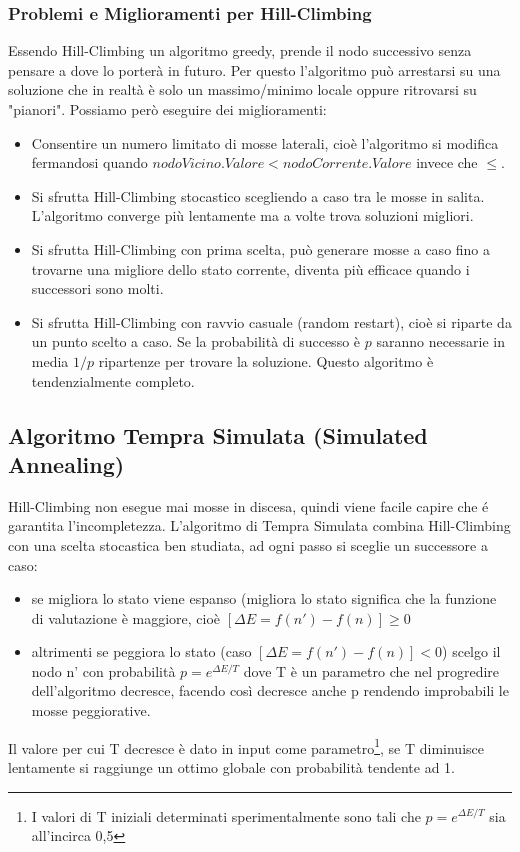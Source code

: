 \documentclass{article}
\begin{document}
\subsubsection{Problemi e Miglioramenti per Hill-Climbing}
Essendo Hill-Climbing un algoritmo greedy, prende il nodo successivo senza pensare a dove lo porterà in futuro. Per questo l'algoritmo può arrestarsi su una soluzione che in realtà è solo un massimo/minimo locale oppure ritrovarsi su "pianori". Possiamo però eseguire dei miglioramenti:
\begin{itemize}
    \item Consentire un numero limitato di mosse laterali, cioè l'algoritmo si modifica fermandosi quando $nodoVicino.Valore < nodoCorrente.Valore$ invece che $\leq$.
    \item Si sfrutta Hill-Climbing stocastico scegliendo a caso tra le mosse in salita. L'algoritmo converge più lentamente ma a volte trova soluzioni migliori.
    \item Si sfrutta Hill-Climbing con prima scelta, può generare mosse a caso fino a trovarne una migliore dello stato corrente, diventa più efficace quando i successori sono molti.
    \item Si sfrutta Hill-Climbing con ravvio casuale (random restart), cioè si riparte da un punto scelto a caso. Se la probabilità di successo è $p$ saranno necessarie in media $1/p$ ripartenze per trovare la soluzione. Questo algoritmo è tendenzialmente completo.
\end{itemize}

\subsection{Algoritmo Tempra Simulata (Simulated Annealing)}
Hill-Climbing non esegue mai mosse in discesa, quindi viene facile capire che é garantita l'incompletezza. L'algoritmo di Tempra Simulata combina Hill-Climbing con una scelta stocastica ben studiata, ad ogni passo si sceglie un successore a caso:
\begin{itemize}
    \item se migliora lo stato viene espanso (migliora lo stato significa che la funzione di valutazione è maggiore, cioè $[\Delta E = f(n')-f(n)] \geq 0$
    \item altrimenti se peggiora lo stato (caso $[\Delta E = f(n')-f(n)] < 0$) scelgo il nodo n' con probabilità $p=e^{\Delta E / T}$ dove T è un parametro che nel progredire dell'algoritmo decresce, facendo così decresce anche p rendendo improbabili le mosse peggiorative.
\end{itemize}
Il valore per cui T decresce è dato in input come parametro\footnote{I valori di T iniziali determinati sperimentalmente sono tali che $p=e^{\Delta E / T}$ sia all'incirca 0,5}, se T diminuisce lentamente si raggiunge un ottimo globale con probabilità tendente ad 1.
\clearpage
\end{document}
